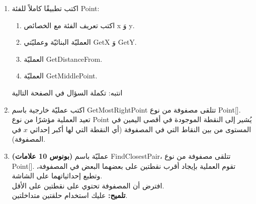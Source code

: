 \documentclass[14pt]{extarticle}
\begin{document}
\begin{enumerate}[label=\textbf{(\Alph*)}]
    \item اكتب تطبيقًا كاملاً للفئة \textenglish{Point}:
\begin{enumerate}[label=\textbf{(\arabic*)}]
    \item اكتب تعريف الفئة مع الخصائص \textenglish{x} وَ \textenglish{y}.
    \item العمليّة البنائيّة وعمليّتي \textenglish{GetX} وَ \textenglish{GetY}.
    \item العمليّة \textenglish{GetDistanceFrom}.
    \item العمليّة \textenglish{GetMiddlePoint}.
\end{enumerate}
\begin{flushleft}
    انتبه: تكملة السؤال في الصفحة التالية
\end{flushleft}
\clearpage
\item اكتب عمليّة خارجية باسم \textenglish{GetMostRightPoint} تتلقى مصفوفة من نوع \textenglish{Point[]}.
تعيد العملية مؤشرًا من نوع \textenglish{Point} يُشير إلى النقطة الموجودة في أقصى اليمين في المستوى من بين النقاط التي في المصفوفة (أي النقطة التي لها أكبر إحداثي $x$ في المصفوفة).


\item \textbf{(بونوس 10 علامات)} عمليّة باسم \textenglish{FindClosestPair}، تتلقى مصفوفة من نوع \textenglish{Point[]}.
    تقوم العملية بإيجاد أقرب نقطتين على بعضهما البعض في المصفوفة، وتطبع إحداثياتهما على الشاشة. \\
    افترض أن المصفوفة تحتوي على نقطتين على الأقل. \\
    \textbf{تلميح:} عليك استخدام حلقتين متداخلتين.

\end{enumerate}
\end{document}
